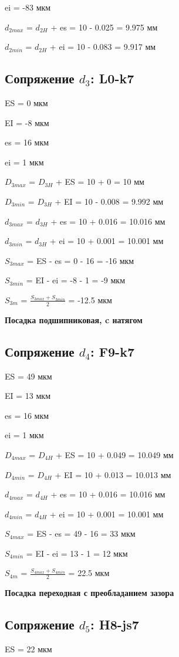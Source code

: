 \documentclass[a4paper,fontsize=12pt]{article}
\begin{document}
ei = -83 мкм

$d_{2max}$ = $d_{2H}$ + es = 10 - 0.025 = 9.975 мм

$d_{2min}$ = $d_{2H}$ + ei = 10 - 0.083 = 9.917 мм

\subsection{Сопряжение $d_3$:  L0-k7}
ES = 0 мкм

EI = -8 мкм

es = 16 мкм

ei = 1 мкм

$D_{3max}$ = $D_{3H}$ + ES = 10 + 0 = 10 мм

$D_{3min}$ = $D_{3H}$ + EI = 10 - 0.008 = 9.992 мм

$d_{3max}$ = $d_{3H}$ + es = 10 + 0.016 = 10.016 мм

$d_{3min}$ = $d_{3H}$ + ei = 10 + 0.001 = 10.001 мм

$S_{3max}$ = ES - es = 0 - 16 = -16 мкм

$S_{3min}$ = EI - ei = -8 - 1 = -9 мкм

$S_{3m}$ = $\frac{S_{3max} + S_{3min}}{2}$ = -12.5 мкм

\textbf{Посадка подшипниковая, c натягом}

\subsection{Сопряжение $d_4$:  F9-k7}
ES = 49 мкм

EI = 13 мкм

es = 16 мкм

ei = 1 мкм

$D_{4max}$ = $D_{4H}$ + ES = 10 + 0.049 = 10.049 мм

$D_{4min}$ = $D_{4H}$ + EI = 10 + 0.013 = 10.013 мм

$d_{4max}$ = $d_{4H}$ + es = 10 + 0.016 = 10.016 мм

$d_{4min}$ = $d_{4H}$ + ei = 10 + 0.001 = 10.001 мм

$S_{4max}$ = ES - es = 49 - 16 = 33 мкм

$S_{4min}$ = EI - ei = 13 - 1 = 12 мкм

$S_{4m}$ = $\frac{S_{4max} + S_{4min}}{2}$ = 22.5 мкм

\textbf{Посадка переходная с преобладанием зазора}

\subsection{Сопряжение $d_5$:  H8-js7}
ES = 22 мкм
\end{document}
